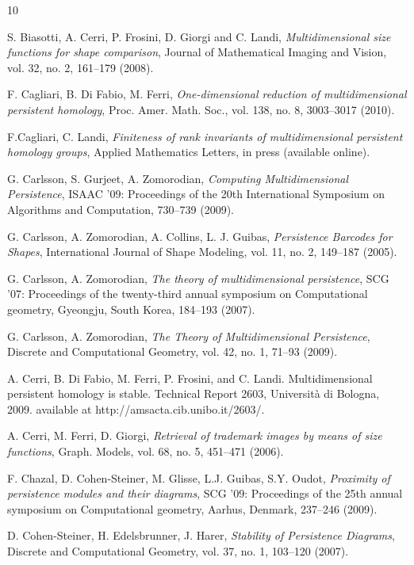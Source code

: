 \documentclass{amsart}
\theoremstyle{definition}
\theoremstyle{remark}
\numberwithin{equation}{section}
\begin{document}
\begin{thebibliography}{10}

 S. Biasotti, A. Cerri, P. Frosini, D. Giorgi and
C. Landi, {\it Multidimensional size functions for shape comparison}, Journal of Mathematical Imaging and Vision, vol. 32, no. 2, 161--179 (2008).

 F. Cagliari, B. Di Fabio, M. Ferri,
{\it One-dimensional reduction of multidimensional persistent homology}, Proc. Amer. Math. Soc., vol. 138, no. 8, 3003--3017 (2010).

F.Cagliari, C. Landi, {\it Finiteness of  rank invariants of multidimensional persistent homology groups}, Applied Mathematics Letters, in press (available online).

G. Carlsson, S. Gurjeet, A. Zomorodian,
{\em Computing Multidimensional Persistence},
ISAAC '09: Proceedings of the 20th International Symposium on Algorithms and Computation, 730--739 (2009).


G. Carlsson, A. Zomorodian, A. Collins, L. J. Guibas,
\emph{Persistence Barcodes for Shapes},
International Journal of Shape Modeling, vol. 11, no. 2, 149--187 (2005).

G. Carlsson, A. Zomorodian,
\emph{The theory of multidimensional persistence},
SCG '07: Proceedings of the twenty-third annual symposium on Computational geometry, Gyeongju, South Korea, 184--193 (2007).

 G. Carlsson, A. Zomorodian,  {\it The Theory of Multidimensional Persistence}, Discrete and Computational Geometry, vol. 42, no. 1, 71--93 (2009).

A. Cerri, B. Di Fabio, M. Ferri, P. Frosini, and C. Landi. Multidimensional persistent homology is stable. Technical Report 2603, Universit\`a di Bologna, 2009. available at http://amsacta.cib.unibo.it/2603/.

 A. Cerri, M. Ferri, D. Giorgi,  {\it Retrieval of trademark images by means of size functions}, Graph. Models, vol. 68, no. 5, 451--471 (2006).

 F. Chazal, D. Cohen-Steiner, M. Glisse, L.J. Guibas, S.Y. Oudot,  {\it Proximity of persistence modules and their diagrams}, SCG '09: Proceedings of the 25th annual symposium on Computational geometry, Aarhus, Denmark, 237--246 (2009).

 D. Cohen-Steiner, H. Edelsbrunner, J. Harer,
{\em Stability of Persistence Diagrams},
Discrete and Computational Geometry, vol. 37, no. 1, 103--120 (2007).


\end{thebibliography}
\end{document}

